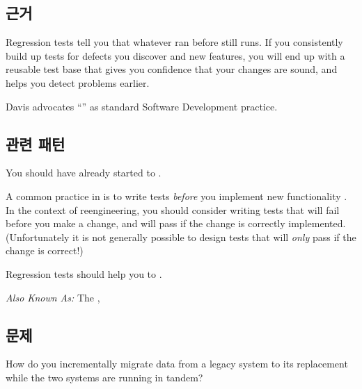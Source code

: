 \documentclass[a4paper,10pt,twoside]{book}
\begin{document}
\subsection*{근거}

Regression tests tell you that whatever ran before still runs. If you consistently build up tests for defects you discover and new features, you will end up with a reusable test base that gives you confidence that your changes are sound, and helps you detect problems earlier.

Davis advocates ``'' \cite{Davi95a} as standard Software Development practice.

\subsection*{관련 패턴}

You should have already started to . 

A common practice in  is to write tests \emph{before} you implement new functionality \cite{Jeff01a}. In the context of reengineering, you should consider writing tests that will fail before you make a change, and will pass if the change is correctly implemented. (Unfortunately it is not generally possible to design tests that will \emph{only} pass if the change is correct!)

Regression tests should help you to .


\emph{Also Known As:}  The  \cite{Kell00a},  \cite{Brod95a}


\subsection*{문제}

How do you incrementally migrate data from a legacy system to its replacement while the two systems are running in tandem?
\end{document}
